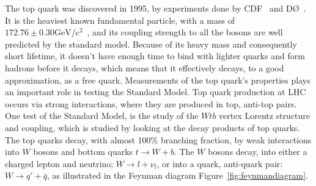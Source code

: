 \documentclass[12pt,a4paper]{article}
\numberwithin{equation}{section}
\begin{document}
The top quark was discovered in 1995, by experiments done by CDF~\cite{Abe_1995}
and DØ~\cite{Abachi_1995}. It is the heaviest known fundamental particle, with a
mass of $172.76 \pm 0.30 \mathrm{GeV/c^2}$~\cite{pdg}, and its coupling
strength to all the bosons are well predicted by the standard model. Because of
its heavy mass and consequently short lifetime, it doesn't have enough time to
bind with lighter quarks and form hadrons before it decays, which means that it
effectively decays, to a good approximation, as a free quark. Measurements of
the top quark's properties plays an important role in testing the Standard
Model. Top quark production at LHC occurs via strong interactions, where they
are produced in top, anti-top pairs. One test of the Standard Model, is the
study of the $Wtb$ vertex Lorentz structure and coupling, which is studied by
looking at the decay products of top quarks. The top quarks decay, with almost
100\% branching fraction, by weak interactions into $W$ bosons and bottom quarks
$t \rightarrow W + b$. The $W$ bosons decay, into either a charged lepton and neutrino;
$W \rightarrow l + \nu_l$, or into a quark, anti-quark pair: $W \rightarrow q' + \bar{q}$, as
illustrated in the Feynman diagram Figure~\ref{fig:feynmandiagram}.\\
\end{document}
